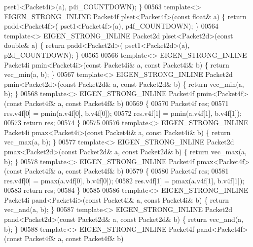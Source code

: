 \begin{DoxyCode}
{      pset1<Packet4i>(a), p4i\_COUNTDOWN); \}
00563 \textcolor{keyword}{template}<> EIGEN\_STRONG\_INLINE Packet4f plset<Packet4f>(\textcolor{keyword}{const} \textcolor{keywordtype}{float}& a)  \{ \textcolor{keywordflow}{return} padd<Packet4f>(
      pset1<Packet4f>(a), p4f\_COUNTDOWN); \}
00564 \textcolor{keyword}{template}<> EIGEN\_STRONG\_INLINE Packet2d plset<Packet2d>(\textcolor{keyword}{const} \textcolor{keywordtype}{double}& a) \{ \textcolor{keywordflow}{return} padd<Packet2d>(
      pset1<Packet2d>(a), p2d\_COUNTDOWN); \}
00565 
00566 \textcolor{keyword}{template}<> EIGEN\_STRONG\_INLINE Packet4i pmin<Packet4i>(\textcolor{keyword}{const} Packet4i& a, \textcolor{keyword}{const} Packet4i& b) \{ \textcolor{keywordflow}{return} 
      vec\_min(a, b); \}
00567 \textcolor{keyword}{template}<> EIGEN\_STRONG\_INLINE Packet2d pmin<Packet2d>(\textcolor{keyword}{const} Packet2d& a, \textcolor{keyword}{const} Packet2d& b) \{ \textcolor{keywordflow}{return} 
      vec\_min(a, b); \}
00568 \textcolor{keyword}{template}<> EIGEN\_STRONG\_INLINE Packet4f pmin<Packet4f>(\textcolor{keyword}{const} Packet4f& a, \textcolor{keyword}{const} Packet4f& b)
00569 \{
00570   Packet4f res;
00571   res.v4f[0] = pmin(a.v4f[0], b.v4f[0]);
00572   res.v4f[1] = pmin(a.v4f[1], b.v4f[1]);
00573   \textcolor{keywordflow}{return} res;
00574 \}
00575 
00576 \textcolor{keyword}{template}<> EIGEN\_STRONG\_INLINE Packet4i pmax<Packet4i>(\textcolor{keyword}{const} Packet4i& a, \textcolor{keyword}{const} Packet4i& b) \{ \textcolor{keywordflow}{return} 
      vec\_max(a, b); \}
00577 \textcolor{keyword}{template}<> EIGEN\_STRONG\_INLINE Packet2d pmax<Packet2d>(\textcolor{keyword}{const} Packet2d& a, \textcolor{keyword}{const} Packet2d& b) \{ \textcolor{keywordflow}{return} 
      vec\_max(a, b); \}
00578 \textcolor{keyword}{template}<> EIGEN\_STRONG\_INLINE Packet4f pmax<Packet4f>(\textcolor{keyword}{const} Packet4f& a, \textcolor{keyword}{const} Packet4f& b)
00579 \{
00580   Packet4f res;
00581   res.v4f[0] = pmax(a.v4f[0], b.v4f[0]);
00582   res.v4f[1] = pmax(a.v4f[1], b.v4f[1]);
00583   \textcolor{keywordflow}{return} res;
00584 \}
00585 
00586 \textcolor{keyword}{template}<> EIGEN\_STRONG\_INLINE Packet4i pand<Packet4i>(\textcolor{keyword}{const} Packet4i& a, \textcolor{keyword}{const} Packet4i& b) \{ \textcolor{keywordflow}{return} 
      vec\_and(a, b); \}
00587 \textcolor{keyword}{template}<> EIGEN\_STRONG\_INLINE Packet2d pand<Packet2d>(\textcolor{keyword}{const} Packet2d& a, \textcolor{keyword}{const} Packet2d& b) \{ \textcolor{keywordflow}{return} 
      vec\_and(a, b); \}
00588 \textcolor{keyword}{template}<> EIGEN\_STRONG\_INLINE Packet4f pand<Packet4f>(\textcolor{keyword}{const} Packet4f& a, \textcolor{keyword}{const} Packet4f& b)
}
\end{DoxyCode}
